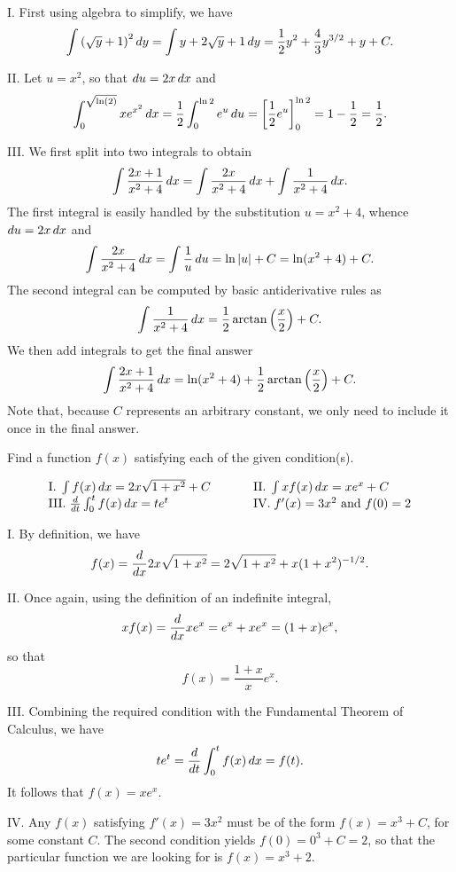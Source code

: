 \documentclass[]{ximera}
\begin{document}
\begin{freeResponse} I. First using algebra to simplify, we have
$$
\int \left(\sqrt{y}+1\right)^2 \mathop{}\!d y = \int y + 2 \sqrt{y} + 1 \mathop{}\!d y = \frac{1}{2}y^2 + \frac{4}{3} y^{3/2} + y + C.
$$

II. Let $u = x^2$, so that $\mathop{}\!d u = 2 x \mathop{}\!d x$ and 
$$
\int_0^{\sqrt{\ln(2)}} x e^{x^2} \mathop{}\!d x = \frac{1}{2} \int_0 ^{\ln 2} e^u \mathop{}\!d u = \bigg[ \frac{1}{2} e^u \bigg]_0^{\ln 2} = 1- \frac{1}{2} = \frac{1}{2}.
$$

III. We first split into two integrals to obtain 
$$
\int \frac{2x+1}{x^2+4} \mathop{}\!d x = \int \frac{2x}{x^2 + 4} \mathop{}\!d x + \int \frac{1}{x^2 + 4} \mathop{}\!d x.
$$
The first integral is easily handled by the substitution $u = x^2 + 4$, whence $\mathop{}\!d u = 2 x \mathop{}\!d x$ and 
$$
\int \frac{2x}{x^2 + 4} \mathop{}\!d x = \int \frac{1}{u} \mathop{}\!d u = \ln |u| + C = \ln (x^2 + 4) + C.
$$
The second integral can be computed by basic antiderivative rules as 
$$
\int \frac{1}{x^2 + 4} \mathop{}\!d x = \frac{1}{2} \arctan \left(\frac{x}{2}\right) + C.
$$
We then add integrals to get the final answer
$$
\int \frac{2x+1}{x^2+4} \mathop{}\!d x = \ln (x^2 + 4) + \frac{1}{2} \arctan \left(\frac{x}{2}\right) + C.
$$
Note that, because $C$ represents an arbitrary constant, we only need to include it once in the final answer.
\end{freeResponse}

\begin{problem}
Find a function $f(x)$ satisfying each of the given condition(s).

$$
\begin{array}{lll}
\mathrm{I.} \; \int f(x) \mathop{}\!d x = 2x \sqrt{1+ x^2} + C & \hspace{.2in} & \mathrm{II.} \; \int xf(x) \mathop{}\!d x = x e^x + C \\
\mathrm{III.} \; \frac{\mathop{}\!d}{\mathop{}\!d t} \int_0^t f(x) \mathop{}\!d x = t e^t & \hspace{.2in} & \mathrm{IV.} \; f'(x) = 3x^2 \mbox{ and } f(0)=2
\end{array}
$$
\end{problem}

\begin{freeResponse} I. By definition, we have
$$
f(x) = \frac{\mathop{}\!d}{\mathop{}\!d x}  2x \sqrt{1+ x^2}  = 2 \sqrt{1+x^2} + x  (1+x^2)^{-1/2}.
$$

II. Once again, using the definition of an indefinite integral, 
$$
x f(x) = \frac{\mathop{}\!d}{\mathop{}\!d x} x e^x = e^x + x e^x = (1+x)e^x,
$$
so that 
$$
f(x) = \frac{1+x}{x} e^x.
$$

III. Combining the required condition with the Fundamental Theorem of Calculus, we have
$$
te^t = \frac{\mathop{}\!d}{\mathop{}\!d t} \int_0^t f(x) \mathop{}\!d x = f(t).
$$
It follows that $f(x) = x e^x$.

IV. Any $f(x)$ satisfying $f'(x) = 3x^2$ must be of the form $f(x) = x^3 + C$, for some constant $C$. The second condition yields $f(0)=0^3 + C = 2$, so that the particular function we are looking for is $f(x) = x^3 + 2$. 
\end{freeResponse}
\end{document}
